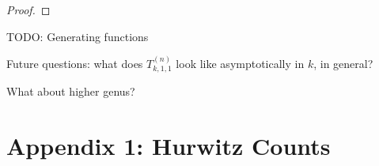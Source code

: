 \documentclass[11pt]{article}           %
\theoremstyle{definition}
\begin{document}
\begin{proof}
  \iffalse
  , so we can prove the proposition
  regardless of the parity of $k$:
  \begin{itemize}
  \item If $k=2m+1$ is odd, then
    \begin{align*}
      U_{k,1}^{(3)} &= 9+\sum_{j=1}^m\left(\frac{8(2j+1)^3}{3}+2(2j+1)^2+\frac{10(2j+1)}{3}+1\right) \\
      &= 9+\sum_{j=1}^m\left(\frac{64}{3}j^3+40j^2+\frac{92}{3}j+9\right) \\
      &= 
    \end{align*}
    \item
  \end{itemize}
  \fi
\end{proof}

TODO: Generating functions

Future questions: what does $T_{k,1,1}^{(n)}$ look like asymptotically in $k$, in general?

What about higher genus?

\section{Appendix 1: Hurwitz Counts}
\end{document}

